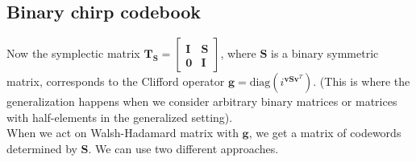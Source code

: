 \documentclass{article}
\begin{document}
\subsection*{Binary chirp codebook}
Now the symplectic matrix $\mathbf{T}_\mathbf{S} = \begin{bmatrix} \mathbf{I} & \mathbf{S} \\ \mathbf{0} & \mathbf{I} \end{bmatrix}$, where $\mathbf{S}$ is a binary symmetric matrix, corresponds to the Clifford operator $\mathbf{g} = \text{diag}(i^{\mathbf{v}\mathbf{S}\mathbf{v}^T})$. (This is where the generalization happens when we consider arbitrary binary matrices or matrices with half-elements in the generalized setting). \\	 

When we act on Walsh-Hadamard matrix with $\mathbf{g}$, we get a matrix of codewords determined by $\mathbf{S}$. We can use two different approaches.
\end{document}
